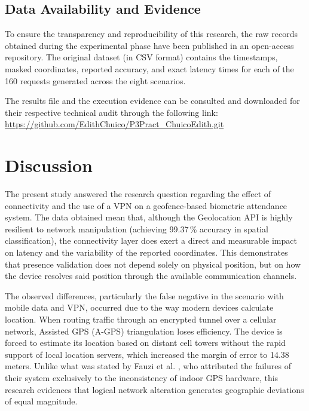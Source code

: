 \documentclass[runningheads]{llncs}
\begin{document}
\subsection{Data Availability and Evidence}
To ensure the transparency and reproducibility of this research, the raw records obtained during the experimental phase have been published in an open-access repository. The original dataset (in CSV format) contains the timestamps, masked coordinates, reported accuracy, and exact latency times for each of the 160 requests generated across the eight scenarios. 

The results file and the execution evidence can be consulted and downloaded for their respective technical audit through the following link: 
\url{https://github.com/EdithChuico/P3Pract_ChuicoEdith.git}

\section{Discussion}

The present study answered the research question regarding the effect of connectivity and the use of a VPN on a geofence-based biometric attendance system. The data obtained mean that, although the Geolocation API is highly resilient to network manipulation (achieving 99.37\,\% accuracy in spatial classification), the connectivity layer does exert a direct and measurable impact on latency and the variability of the reported coordinates. This demonstrates that presence validation does not depend solely on physical position, but on how the device resolves said position through the available communication channels.

The observed differences, particularly the false negative in the scenario with mobile data and VPN, occurred due to the way modern devices calculate location. When routing traffic through an encrypted tunnel over a cellular network, Assisted GPS (A-GPS) triangulation loses efficiency. The device is forced to estimate its location based on distant cell towers without the rapid support of local location servers, which increased the margin of error to 14.38 meters. Unlike what was stated by Fauzi et al. \cite{fauzi2025}, who attributed the failures of their system exclusively to the inconsistency of indoor GPS hardware, this research evidences that logical network alteration generates geographic deviations of equal magnitude.
\end{document}
